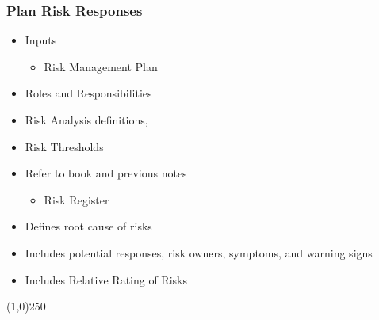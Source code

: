 \begin{frame}
\frametitle{Plan Risk Responses}
\begin{itemize}
\item Inputs
\begin{itemize}
	\item Risk Management Plan
\end{itemize}
\item Roles and Responsibilities
\item Risk Analysis definitions, 
\item Risk Thresholds
\item Refer to book and previous notes
\begin{itemize}
	\item Risk Register
\end{itemize}
\item Defines root cause of risks
\item Includes potential responses, risk owners, symptoms, and warning signs
\item Includes Relative Rating of Risks
\end{itemize}
\end{frame}\begin{center}\line(1,0){250}\end{center}





